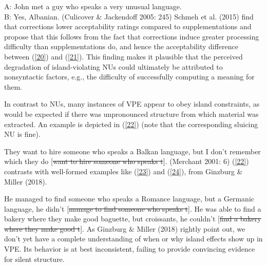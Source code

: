 \documentclass[output=paper]{langsci/langscibook}
\begin{document}
{\ea A: John met a guy who speaks a very unusual language. \\B: Yes, Albanian. (Culicover \& Jackendoff 2005: 245) \label{21}\z
Schmeh et al. (2015) find that corrections lower acceptability ratings compared to supplementations and propose that this follows from the fact that corrections induce greater processing difficulty than supplementations do, and hence the acceptability difference between (\ref{20}) and (\ref{21}). This finding makes it plausible that the perceived degradation of island-violating NUs could ultimately be attributed to nonsyntactic factors, e.g., the difficulty of successfully computing a meaning for them.

In contrast to NUs, many instances of VPE appear to obey island constraints, as would be expected if there was unpronounced structure from which material was extracted. An example is depicted in (\ref{22}) (note that the corresponding sluicing NU is fine).

\ea *They want to hire someone who speaks a Balkan language, but I don't remember which they do [\sout{want to hire someone who speaks t}]. (Merchant
2001: 6)\label{22}\z
(\ref{22}) contrasts with well-formed examples like (\ref{23}) and (\ref{24}), from Ginzburg \& Miller (2018).

\ea He managed to find someone who speaks a Romance language, but a Germanic language, he didn't [\sout{manage to find someone who speaks t}].\label{23}\z
\ea He was able to find a bakery where they make good baguette, but croissants, he couldn't [\sout{find a bakery where they make good t}].\label{24}\z
As Ginzburg \& Miller (2018) rightly point out, we don't yet have a complete understanding of when or why island effects show up in VPE. Its behavior is at best inconsistent, failing to provide convincing evidence for silent structure.


}
\end{document}
